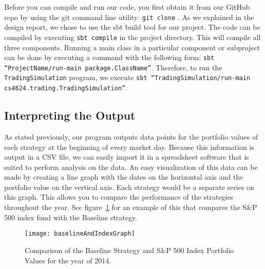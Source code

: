 Before you can compile and run our code, you first obtain it from our GitHub repo by using the git command line utility: \texttt{git clone}  \cite{github}.
As we explained in the design report, we chose to use the sbt build tool for our project.
The code can be compiled by executing \texttt{sbt compile} in the project directory.
This will compile all three components.
Running a main class in a particular component or subproject can be done by executing a command with the following form: \texttt{sbt ``ProjectName/run-main package.ClassName''}.
Therefore, to run the \texttt{TradingSimulation} program, we execute \texttt{sbt ``TradingSimulation/run-main cs4624.trading.TradingSimulation''}.

\subsection{Interpreting the Output}

As stated previously, our program outputs data points for the portfolio values of each strategy at the beginning of every market day.
Because this information is output in a CSV file, we can easily import it in a spreadsheet software that is suited to perform analysis on the data.
An easy visualization of this data can be made by creating a line graph with the dates on the horizontal axis and the portfolio value on the vertical axis.
Each strategy would be a separate series on this graph.
This allows you to compare the performance of the strategies throughout the year.
See figure~\ref{baselineAndIndexGraph} for an example of this that compares the S\&P 500 index fund with the Baseline strategy.

\begin{figure}[h]
  \label{baselineAndIndexGraph}
  \begin{center}
    \texttt{[image: baselineAndIndexGraph]}
  \end{center}
  \caption{Comparison of the Baseline Strategy and S\&P 500 Index Portfolio Values for the year of 2014.}
\end{figure}

